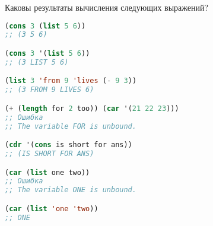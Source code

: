Каковы результаты вычисления следующих выражений?

\begin{lstlisting}[language=Lisp]
(cons 3 (list 5 6))
;; (3 5 6)

(cons 3 '(list 5 6))
;; (3 LIST 5 6)

(list 3 'from 9 'lives (- 9 3))
;; (3 FROM 9 LIVES 6)

(+ (length for 2 too)) (car '(21 22 23)))
;; Ошибка
;; The variable FOR is unbound.

(cdr '(cons is short for ans))
;; (IS SHORT FOR ANS)

(car (list one two))
;; Ошибка
;; The variable ONE is unbound.

(car (list 'one 'two))
;; ONE
\end{lstlisting}

